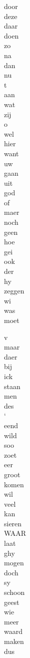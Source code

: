 \begin{minipage}[t]{0.25\textwidth}
	door\\
	deze\\
	daar\\
	doen\\
	zo\\
	na\\
	dan\\
	nu\\
	t\\
	aan\\
	wat\\
	zij\\
	o\\
	wel\\
	hier\\
	want\\
	uw\\
	gaan\\
	uit\\
	god\\
	of\\
	maer\\
	noch\\
	geen\\
	hoe\\
	gei\\
	ook\\
	der\\
	hy\\
	zeggen\\
	wi\\
	was\\
	moet
\end{minipage}
\begin{minipage}[t]{0.25\textwidth}
	v\\
	maar\\
	daer\\
	bij\\
	ick\\
	staan\\
	men\\
	des\\
	‘\\
	eend\\
	wild\\
	soo\\
	zoet\\
	eer\\
	groot\\
	komen\\
	wil\\
	veel\\
	kan\\
	sieren\\
	WAAR\\
	laat\\
	ghy\\
	mogen\\
	doch\\
	sy\\
	schoon\\
	geest\\
	wie\\
	meer\\
	waard\\
	maken\\
	dus\\
\end{minipage}
